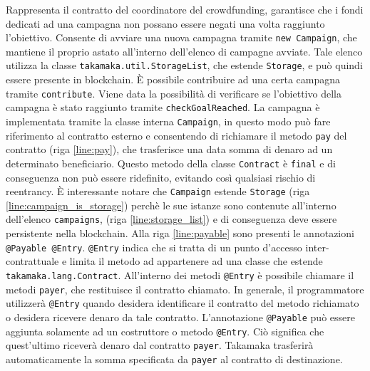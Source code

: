 %
Rappresenta il contratto del coordinatore del crowdfunding, garantisce che i fondi dedicati ad una campagna non possano essere negati una volta raggiunto l'obiettivo. Consente di avviare una nuova campagna tramite \lstinline|new Campaign|, che mantiene il proprio astato all'interno dell'elenco di campagne avviate. Tale elenco utilizza la classe \lstinline|takamaka.util.StorageList|, che estende \lstinline|Storage|, e può quindi essere presente in blockchain. È possibile contribuire ad una certa campagna tramite \lstinline|contribute|. Viene data la possibilità di verificare se l'obiettivo della campagna è stato raggiunto tramite \lstinline|checkGoalReached|. La campagna è implementata tramite la classe interna \lstinline|Campaign|, in questo modo può fare riferimento al contratto esterno e consentendo di richiamare il metodo \lstinline|pay| del contratto (riga \ref{line:pay}), che trasferisce una data somma di denaro ad un determinato beneficiario. Questo metodo della classe \lstinline|Contract| è \lstinline|final| e di conseguenza non può essere ridefinito, evitando così qualsiasi rischio di reentrancy. È interessante notare che \lstinline|Campaign| estende \lstinline|Storage| (riga \ref{line:campaign_is_storage}) perchè le sue istanze sono contenute all'interno dell'elenco \lstinline|campaigns|, (riga \ref{line:storage_list}) e di conseguenza deve essere persistente nella blockchain.
Alla riga \ref{line:payable} sono presenti le annotazioni \lstinline|@Payable @Entry|. \lstinline|@Entry| indica che si tratta di un punto d'accesso inter-contrattuale e limita il metodo ad appartenere ad una classe che estende \lstinline|takamaka.lang.Contract|. All'interno dei metodi \lstinline|@Entry| è possibile chiamare il metodi \lstinline|payer|, che restituisce il contratto chiamato. In generale, il programmatore utilizzerà \lstinline|@Entry| quando desidera identificare il contratto del metodo richiamato o desidera ricevere denaro da tale contratto. L'annotazione \lstinline|@Payable| può essere aggiunta solamente ad un costruttore o metodo \lstinline|@Entry|. Ciò significa che quest'ultimo riceverà denaro dal contratto \lstinline|payer|. Takamaka trasferirà automaticamente la somma specificata da \lstinline|payer| al contratto di destinazione.

